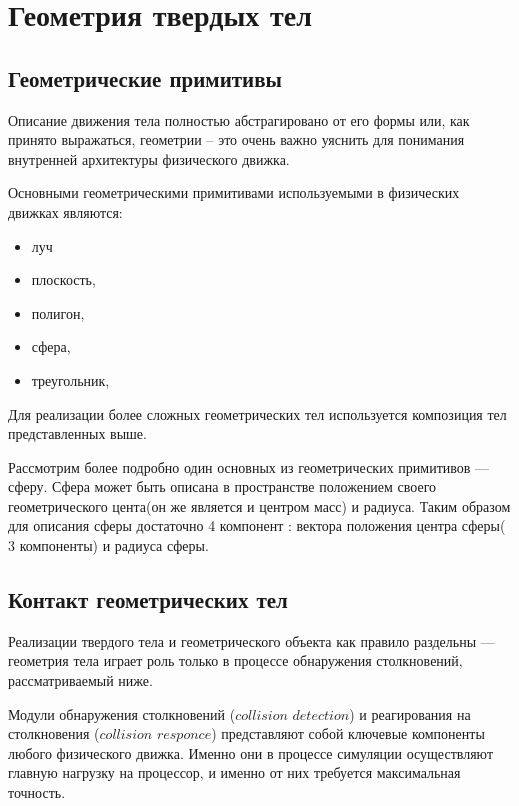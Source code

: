 \chapter{Геометрия твердых тел}
\section{Геометрические примитивы}
Описание движения тела полностью абстрагировано от его формы
или, как принято выражаться, геометрии – это очень важно
уяснить для понимания внутренней архитектуры физического
движка.

Основными геометрическими примитивами используемыми в физических движках являются:
\begin{itemize}
 \item  луч 
 \item  плоскость,
 \item  полигон,
 \item  сфера,
 \item  треугольник,
 \end{itemize}
Для реализации более сложных геометрических тел используется композиция тел представленных выше.

Рассмотрим более подробно один основных из геометрических примитивов --- сферу.
Сфера может быть описана в пространстве положением своего геометрического цента(он же является и центром масс)
и радиуса. Таким образом для описания сферы достаточно 4 компонент : вектора положения центра сферы( 3 компоненты) и радиуса сферы.


\section{Контакт геометрических тел}
Реализации твердого тела и геометрического объекта как правило раздельны --- геометрия тела играет роль только в
процессе обнаружения столкновений, рассматриваемый ниже.

Модули обнаружения столкновений ($collision$ $detection$) и реагирования на столкновения ($collision$ $responce$) представляют 
собой ключевые компоненты любого физического движка. Именно они в процессе симуляции осуществляют главную нагрузку на
процессор, и именно от них требуется максимальная точность.

